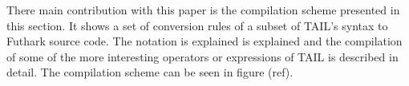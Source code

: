 \documentclass[11pt]{article}
\begin{document}
There main contribution with this paper is the compilation scheme presented in this section.
It shows a set of conversion rules of a subset of TAIL's syntax to Futhark source code.
The notation is explained is explained and the compilation of some of the more interesting operators or expressions of TAIL is described in detail. The compilation scheme can be seen in figure (ref). 
\end{document}
